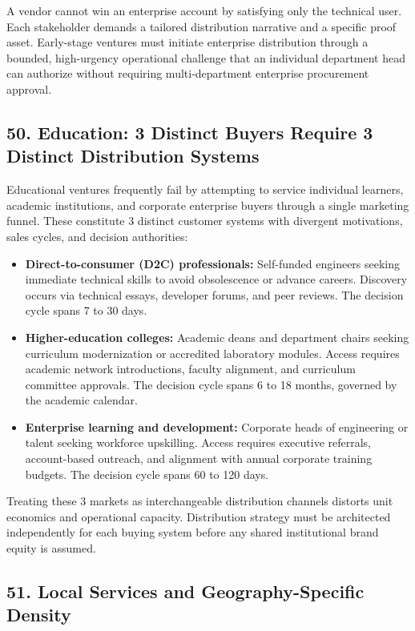 A vendor cannot win an enterprise account by satisfying only the technical user. Each stakeholder demands a tailored distribution narrative and a specific proof asset. Early-stage ventures must initiate enterprise distribution through a bounded, high-urgency operational challenge that an individual department head can authorize without requiring multi-department enterprise procurement approval.

\subsection*{50. Education: 3 Distinct Buyers Require 3 Distinct Distribution Systems}

Educational ventures frequently fail by attempting to service individual learners, academic institutions, and corporate enterprise buyers through a single marketing funnel. These constitute 3 distinct customer systems with divergent motivations, sales cycles, and decision authorities:
\begin{itemize}[leftmargin=*,itemsep=1pt]
  \item \textbf{Direct-to-consumer (D2C) professionals:} Self-funded engineers seeking immediate technical skills to avoid obsolescence or advance careers. Discovery occurs via technical essays, developer forums, and peer reviews. The decision cycle spans 7 to 30 days.
  \item \textbf{Higher-education colleges:} Academic deans and department chairs seeking curriculum modernization or accredited laboratory modules. Access requires academic network introductions, faculty alignment, and curriculum committee approvals. The decision cycle spans 6 to 18 months, governed by the academic calendar.
  \item \textbf{Enterprise learning and development:} Corporate heads of engineering or talent seeking workforce upskilling. Access requires executive referrals, account-based outreach, and alignment with annual corporate training budgets. The decision cycle spans 60 to 120 days.
\end{itemize}

Treating these 3 markets as interchangeable distribution channels distorts unit economics and operational capacity. Distribution strategy must be architected independently for each buying system before any shared institutional brand equity is assumed.

\subsection*{51. Local Services and Geography-Specific Density}

